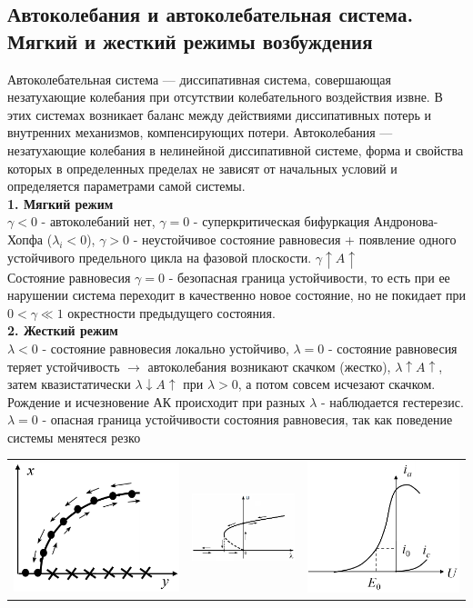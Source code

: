 \begin{multicols*}{2}
		\section{Автоколебания и автоколебательная система. Мягкий и жесткий режимы возбуждения}
		Автоколебательная система — диссипативная система, совершающая незатухающие колебания при отсутствии колебательного воздействия извне. В этих системах возникает баланс между действиями диссипативных потерь и внутренних механизмов, компенсирующих потери. Автоколебания — незатухающие колебания в нелинейной диссипативной системе, форма и свойства которых в определенных пределах не зависят от начальных условий и определяется параметрами самой системы.\\
		\textbf{1. Мягкий режим\\}
		$\gamma < 0$ - автоколебаний нет, $\gamma = 0$ - суперкритическая бифуркация Андронова-Хопфа ($\lambda_i < 0$), $\gamma > 0$ - неустойчивое состояние равновесия + появление одного устойчивого предельного цикла на фазовой плоскости. \quad $\gamma \uparrow A \uparrow$\\
		Состояние равновесия $\gamma = 0$ - безопасная граница устойчивости, то есть при ее нарушении система переходит в качественно новое состояние, но не покидает при $0<\gamma \ll 1$ окрестности предыдущего состояния.\\
		\textbf{2. Жесткий режим\\}
		$\lambda< 0$ - состояние равновесия локально устойчиво, $\lambda = 0$ - состояние равновесия теряет устойчивость $\rightarrow$ автоколебания возникают скачком (жестко), $\lambda \uparrow A \uparrow$, затем квазистатически $\lambda \downarrow A \uparrow$ при $\lambda > 0$, а потом совсем исчезают скачком. Рождение и исчезновение АК происходит при разных $\lambda$ - наблюдается гестерезис. $\lambda = 0$ - опасная граница устойчивости состояния равновесия, так как поведение системы менятеся резко\\
		\begin{tabular}{c c c}
			\includegraphics[width=0.3\linewidth]{tk_img/avtokoleb_1.png} & \includegraphics[width=0.35\linewidth]{tk_img/avtokoleb_2.png} & \includegraphics[width=0.28\linewidth]{tk_img/vax.png}\\

\end{tabular}
\end{multicols*}
